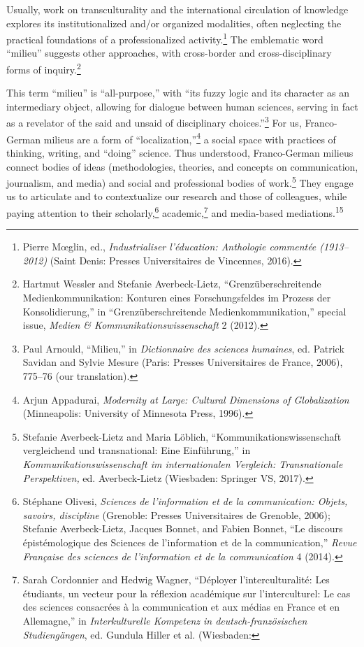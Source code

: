 \documentclass{tufte-handout}
\begin{document}
Usually, work on transculturality and the international circulation of
knowledge explores its institutionalized and/or organized modalities,
often neglecting the practical foundations of a professionalized
activity.\footnote{Pierre Mœglin, ed., \emph{Industrialiser l'éducation:
  Anthologie commentée (1913--2012)} (Saint Denis: Presses
  Universitaires de Vincennes, 2016).} The emblematic word ``milieu''
suggests other approaches, with cross-border and cross-disciplinary
forms of inquiry.\footnote{Hartmut Wessler and Stefanie Averbeck-Lietz,
  ``Grenzüberschreitende Medienkommunikation: Konturen eines
  Forschungsfeldes im Prozess der Konsolidierung,'' in
  ``Grenzüberschreitende Medienkommunikation,'' special issue,
  \emph{Medien \& Kommunikationswissenschaft} 2 (2012).}

\enlargethispage{-\baselineskip}

This term ``milieu'' is ``all-purpose,'' with ``its fuzzy logic and its
character as an intermediary object, allowing for dialogue between human
sciences, serving in fact as a revelator of the said and unsaid of
disciplinary choices.''\footnote{Paul Arnould, ``Milieu,'' in
  \emph{Dictionnaire des sciences humaines}, ed. Patrick Savidan and
  Sylvie Mesure (Paris: Presses Universitaires de France, 2006), 775--76
  (our translation).} For us, Franco-German milieus are a form of
``localization,''\footnote{Arjun Appadurai, \emph{Modernity at Large:
  Cultural Dimensions of Globalization} (Minneapolis: University of
  Minnesota Press, 1996).} a social space with practices of thinking,
writing, and ``doing'' science. Thus understood, Franco-German milieus
connect bodies of ideas (methodologies, theories, and concepts on
communication, journalism, and media) and social and professional bodies
of work.\footnote{Stefanie Averbeck-Lietz and Maria Löblich,
  ``Kommunikationswissenschaft vergleichend und transnational: Eine
  Einführung,'' in \emph{Kommunikationswissenschaft im internationalen
  Vergleich: Transnationale Perspektiven,} ed. Averbeck-Lietz
  (Wiesbaden: Springer VS, 2017).} They engage us to articulate and to
contextualize our research and those of colleagues, while paying
attention to their scholarly,\footnote{Stéphane Olivesi, \emph{Sciences
  de l'information et de la communication: Objets, savoirs, discipline}
  (Grenoble: Presses Universitaires de Grenoble, 2006); Stefanie
  Averbeck-Lietz, Jacques Bonnet, and Fabien Bonnet, ``Le discours
  épistémologique des Sciences de l'information et de la
  communication,'' \emph{Revue Française des sciences de l'information
  et de la communication} 4 (2014).} academic,\footnote{Sarah Cordonnier
  and Hedwig Wagner, ``Déployer l'interculturalité: Les étudiants, un
  vecteur pour la réflexion académique sur l'interculturel: Le cas des
  sciences consacrées à la communication et aux médias en France et en
  Allemagne,'' in \emph{Interkulturelle Kompetenz in
  deutsch-französischen Studiengängen}, ed. Gundula Hiller et al.
  (Wiesbaden:} and media-based mediations.\textsuperscript{15}
\end{document}
